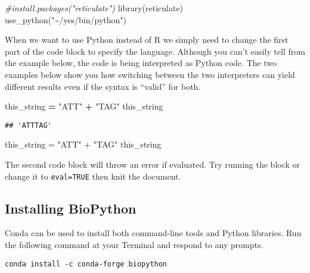 \documentclass[
]{article}
\newenvironment{Shaded}{\begin{snugshade}}{\end{snugshade}}
\newcommand{\CommentTok}[1]{\textcolor[rgb]{0.56,0.35,0.01}{\textit{#1}}}
\newcommand{\FunctionTok}[1]{\textcolor[rgb]{0.00,0.00,0.00}{#1}}
\newcommand{\NormalTok}[1]{#1}
\newcommand{\OperatorTok}[1]{\textcolor[rgb]{0.81,0.36,0.00}{\textbf{#1}}}
\newcommand{\OtherTok}[1]{\textcolor[rgb]{0.56,0.35,0.01}{#1}}
\newcommand{\SpecialCharTok}[1]{\textcolor[rgb]{0.00,0.00,0.00}{#1}}
\newcommand{\StringTok}[1]{\textcolor[rgb]{0.31,0.60,0.02}{#1}}
\begin{document}
\begin{Shaded}
\begin{Highlighting}[]
\CommentTok{\#install.packages("reticulate")}
\FunctionTok{library}\NormalTok{(reticulate)}
\FunctionTok{use\_python}\NormalTok{(}\StringTok{"\textasciitilde{}/yes/bin/python"}\NormalTok{)}
\end{Highlighting}
\end{Shaded}

When we want to use Python instead of R we simply need to change the
first part of the code block to specify the language. Although you can't
easily tell from the example below, the code is being interpreted as
Python code. The two examples below show you how switching between the
two interpreters can yield different results even if the syntax is
``valid'' for both.

\begin{Shaded}
\begin{Highlighting}[]
\NormalTok{this\_string }\OperatorTok{=} \StringTok{"ATT"} \OperatorTok{+} \StringTok{"TAG"}
\NormalTok{this\_string}
\end{Highlighting}
\end{Shaded}

\begin{verbatim}
## 'ATTTAG'
\end{verbatim}

\begin{Shaded}
\begin{Highlighting}[]
\NormalTok{this\_string }\OtherTok{=} \StringTok{"ATT"} \SpecialCharTok{+} \StringTok{"TAG"}
\NormalTok{this\_string}
\end{Highlighting}
\end{Shaded}

The second code block will throw an error if evaluated. Try running the
block or change it to \texttt{eval=TRUE} then knit the document.

\hypertarget{installing-biopython}{%
\subsection{Installing BioPython}\label{installing-biopython}}

Conda can be used to install both command-line tools and Python
libraries. Run the following command at your Terminal and respond to any
prompts.

\begin{verbatim}
conda install -c conda-forge biopython
\end{verbatim}
\end{document}
